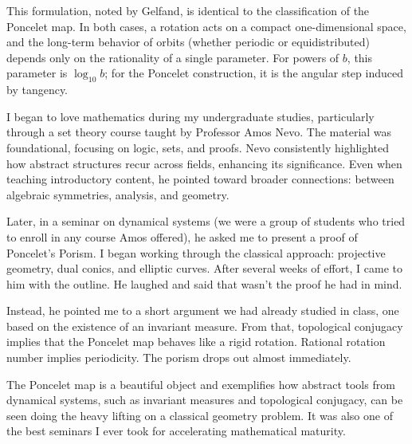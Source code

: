 This formulation, noted by Gelfand, is identical to the classification of the Poncelet map. In both cases, a rotation acts on a compact one-dimensional space, and the long-term behavior of orbits (whether periodic or equidistributed) depends only on the rationality of a single parameter. For powers of $b$, this parameter is $\log_{10} b$; for the Poncelet construction, it is the angular step induced by tangency. 
\newpage
\begin{commentary}
I began to love mathematics during my undergraduate studies, particularly through a set theory course taught by Professor Amos Nevo. The material was foundational, focusing on logic, sets, and proofs. Nevo consistently highlighted how abstract structures recur across fields, enhancing its significance. Even when teaching introductory content, he pointed toward broader connections: between algebraic symmetries, analysis, and geometry.

Later, in a seminar on dynamical systems (we were a group of students who tried to enroll in any course Amos offered), he asked me to present a proof of Poncelet’s Porism. I began working through the classical approach: projective geometry, dual conics, and elliptic curves. After several weeks of effort, I came to him with the outline. He laughed and said that wasn’t the proof he had in mind.

Instead, he pointed me to a short argument we had already studied in class, one based on the existence of an invariant measure. From that, topological conjugacy implies that the Poncelet map behaves like a rigid rotation. Rational rotation number implies periodicity. The porism drops out almost immediately.

The Poncelet map is a beautiful object and exemplifies how abstract tools from dynamical systems, such as invariant measures and topological conjugacy, can be seen doing the heavy lifting on a classical geometry problem. It was also one of the best seminars I ever took for accelerating mathematical maturity.
\end{commentary}

